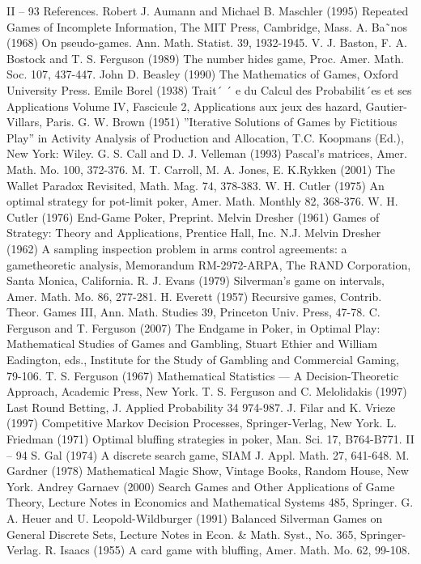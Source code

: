 II – 93
References.
Robert J. Aumann and Michael B. Maschler (1995) Repeated Games of Incomplete Information,
The MIT Press, Cambridge, Mass.
A. Ba˜nos (1968) On pseudo-games. Ann. Math. Statist. 39, 1932-1945.
V. J. Baston, F. A. Bostock and T. S. Ferguson (1989) The number hides game, Proc.
Amer. Math. Soc. 107, 437-447.
John D. Beasley (1990) The Mathematics of Games, Oxford University Press.
Emile Borel (1938) Trait´ ´ e du Calcul des Probabilit´es et ses Applications Volume IV, Fascicule
2, Applications aux jeux des hazard, Gautier-Villars, Paris.
G. W. Brown (1951) ”Iterative Solutions of Games by Fictitious Play” in Activity Analysis
of Production and Allocation, T.C. Koopmans (Ed.), New York: Wiley.
G. S. Call and D. J. Velleman (1993) Pascal’s matrices, Amer. Math. Mo. 100, 372-376.
M. T. Carroll, M. A. Jones, E. K.Rykken (2001) The Wallet Paradox Revisited, Math.
Mag. 74, 378-383.
W. H. Cutler (1975) An optimal strategy for pot-limit poker, Amer. Math. Monthly 82,
368-376.
W. H. Cutler (1976) End-Game Poker, Preprint.
Melvin Dresher (1961) Games of Strategy: Theory and Applications, Prentice Hall, Inc.
N.J.
Melvin Dresher (1962) A sampling inspection problem in arms control agreements: a gametheoretic
analysis, Memorandum RM-2972-ARPA, The RAND Corporation, Santa
Monica, California.
R. J. Evans (1979) Silverman’s game on intervals, Amer. Math. Mo. 86, 277-281.
H. Everett (1957) Recursive games, Contrib. Theor. Games III, Ann. Math. Studies 39,
Princeton Univ. Press, 47-78.
C. Ferguson and T. Ferguson (2007) The Endgame in Poker, in Optimal Play: Mathematical
Studies of Games and Gambling, Stuart Ethier and William Eadington, eds.,
Institute for the Study of Gambling and Commercial Gaming, 79-106.
T. S. Ferguson (1967) Mathematical Statistics — A Decision-Theoretic Approach, Academic
Press, New York.
T. S. Ferguson and C. Melolidakis (1997) Last Round Betting, J. Applied Probability 34
974-987.
J. Filar and K. Vrieze (1997) Competitive Markov Decision Processes, Springer-Verlag,
New York.
L. Friedman (1971) Optimal bluffing strategies in poker, Man. Sci. 17, B764-B771.
II – 94
S. Gal (1974) A discrete search game, SIAM J. Appl. Math. 27, 641-648.
M. Gardner (1978) Mathematical Magic Show, Vintage Books, Random House, New York.
Andrey Garnaev (2000) Search Games and Other Applications of Game Theory, Lecture
Notes in Economics and Mathematical Systems 485, Springer.
G. A. Heuer and U. Leopold-Wildburger (1991) Balanced Silverman Games on General
Discrete Sets, Lecture Notes in Econ. & Math. Syst., No. 365, Springer-Verlag.
R. Isaacs (1955) A card game with bluffing, Amer. Math. Mo. 62, 99-108.
